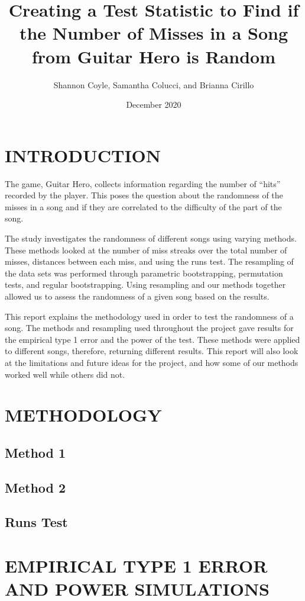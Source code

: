 \documentclass[12pt, letterpaper]{article}
\title{Creating a Test Statistic to Find if the Number of Misses in a Song from Guitar Hero is Random}
\author{Shannon Coyle, Samantha Colucci, and Brianna Cirillo}
\date{December 2020}
\begin{document}
\maketitle

\section{INTRODUCTION}
The game, Guitar Hero, collects information regarding the number of “hits” recorded by the player.  This poses the question about the randomness of the misses in a song and if they are correlated to the difficulty of the part of the song.

The study investigates the randomness of different songs using varying methods.  These methods looked at the number of miss streaks over the total number of misses, distances between each miss, and using the runs test.  The resampling of the data sets was performed through parametric bootstrapping, permutation tests, and regular bootstrapping. Using resampling and our methods together allowed us to assess the randomness of a given song based on the results. 

This report explains the methodology used in order to test the randomness of a song. The methods and resampling used throughout the project gave results for the empirical type 1 error and the power of the test. These methods were applied to different songs, therefore, returning different results. This report will also look at the limitations and future ideas for the project, and how some of our methods worked well while others did not.

\section{METHODOLOGY}
\subsection{Method 1}

\subsection{Method 2}

\subsection{Runs Test}


\section{EMPIRICAL TYPE 1 ERROR AND POWER SIMULATIONS}
\end{document}
